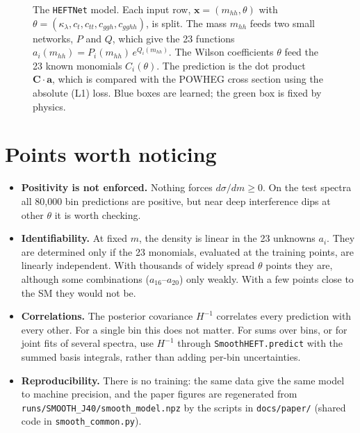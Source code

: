 \documentclass[11pt]{article}
\newcommand{\file}[1]{\nolinkurl{#1}}
\newcommand{\mhh}{m_{hh}}
\newcommand{\kl}{\kappa_\lambda}
\newcommand{\ct}{c_t}
\newcommand{\ctt}{c_{tt}}
\newcommand{\cggh}{c_{ggh}}
\newcommand{\cgghh}{c_{gghh}}
\newcommand{\bC}{\boldsymbol{C}}
\newcommand{\ba}{\boldsymbol{a}}
\newcommand{\code}[1]{\texttt{#1}}
\begin{document}
\begin{figure}[!htb]
\caption{The \code{HEFTNet} model. Each input row, $\boldsymbol{x}=(\mhh,\theta)$ with
$\theta=(\kl,\ct,\ctt,\cggh,\cgghh)$, is split. The mass $\mhh$ feeds
two small networks, $P$ and $Q$, which give the 23 functions
$a_i(\mhh)=P_i(\mhh)\,e^{Q_i(\mhh)}$. The Wilson coefficients $\theta$ feed the
23 known monomials $C_i(\theta)$. The prediction is the dot product $\bC\cdot\ba$,
which is compared with the POWHEG cross section using the absolute (L1) loss.
Blue boxes are learned; the green box is fixed by physics.}
\label{fig:architecture}
\end{figure}

\section{Points worth noticing}
\label{sec:notes}

\begin{itemize}
  \item \textbf{Positivity is not enforced.} Nothing forces $d\sigma/dm \ge 0$. On the test spectra
    all 80,000 bin predictions are positive, but near deep interference dips at other $\theta$ it is
    worth checking.
  \item \textbf{Identifiability.} At fixed $m$, the density is linear in the 23 unknowns $a_i$.
    They are determined only if the 23 monomials, evaluated at the training points, are linearly
    independent. With thousands of widely spread $\theta$ points they are, although some
    combinations ($a_{16}$--$a_{20}$) only weakly. With a few points close to the SM they would not
    be.
  \item \textbf{Correlations.} The posterior covariance $H^{-1}$ correlates every prediction with
    every other. For a single bin this does not matter. For sums over bins, or for joint fits of
    several spectra, use $H^{-1}$ through \code{SmoothHEFT.predict} with the summed basis
    integrals, rather than adding per-bin uncertainties.
  \item \textbf{Reproducibility.} There is no training: the same data give the same model to
    machine precision, and the paper figures are regenerated from
    \file{runs/SMOOTH_J40/smooth_model.npz} by the scripts in \file{docs/paper/} (shared code in
    \file{smooth_common.py}).
\end{itemize}
\end{document}
